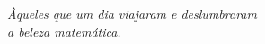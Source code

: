\documentclass[12pt, oneside, a4paper, english, brazil]{abntex2}
\theoremstyle{normal}
\theoremstyle{observacao}
\begin{document}
%
%
%



%
% 
%

\imprimefolhadeaprovacao


\begin{dedicatoria}
\vspace*{\fill}
\hspace{.24\textwidth}
\begin{minipage}{.7\textwidth}
\flushright
\noindent
\textit{Àqueles que um dia viajaram e deslumbraram \\
a beleza matemática.}
\end{minipage}
\end{dedicatoria}
\end{document}
